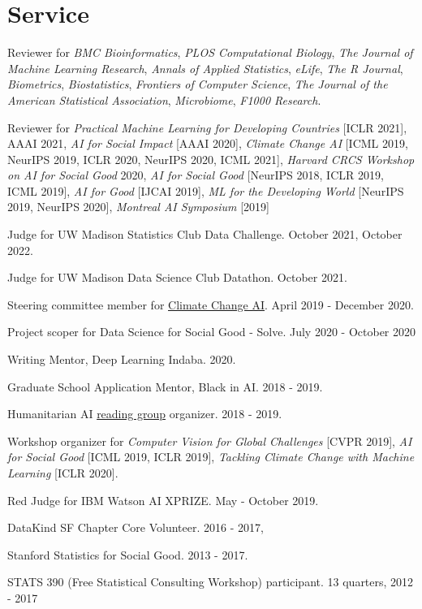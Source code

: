 \documentclass[letterpaper]{article}
\renewenvironment{itemize}{
  \begin{list}{}{
    \setlength{\leftmargin}{1.5em}
  }
}{
  \end{list}
}
\begin{document}
\section*{Service}

\begin{itemize}
\item Reviewer for \textit{BMC Bioinformatics}, \textit{PLOS Computational
Biology}, \textit{The Journal of Machine Learning Research}, \textit{Annals of
Applied Statistics}, \textit{eLife}, \textit{The R Journal},
\textit{Biometrics}, \textit{Biostatistics}, \textit{Frontiers of Computer
Science}, \textit{The Journal of the American Statistical Association},
\textit{Microbiome}, \textit{F1000 Research}.
\item Reviewer for \textit{Practical Machine Learning for Developing Countries}
  [ICLR 2021], AAAI 2021, \textit{AI for Social Impact} [AAAI 2020],
  \textit{Climate Change AI} [ICML 2019, NeurIPS 2019, ICLR 2020, NeurIPS 2020, ICML 2021],
  \textit{Harvard CRCS Workshop on AI for Social Good} 2020, \textit{AI for
    Social Good} [NeurIPS 2018, ICLR 2019, ICML 2019], \textit{AI for Good}
         [IJCAI 2019], \textit{ML for the Developing World} [NeurIPS 2019,
           NeurIPS 2020], \textit{Montreal AI Symposium} [2019]
\item Judge for UW Madison Statistics Club Data Challenge. October 2021, October 2022.
\item Judge for UW Madison Data Science Club Datathon. October 2021.
\item Steering committee member for \href{https://www.climatechange.ai}{Climate
Change AI}. April 2019 - December 2020.
\item Project scoper for Data Science for Social Good - Solve. July 2020 - October 2020
\item Writing Mentor, Deep Learning Indaba. 2020.
\item Graduate School Application Mentor, Black in AI. 2018 - 2019.
\item Humanitarian AI \href{https://krisrs1128.github.io/Humanitarian-AI/}{reading group} organizer. 2018 - 2019.
\item Workshop organizer for \textit{Computer Vision for Global Challenges}
  [CVPR 2019], \textit{AI for Social Good} [ICML 2019, ICLR 2019],
  \textit{Tackling Climate Change with Machine Learning} [ICLR 2020].
\item Red Judge for IBM Watson AI XPRIZE. May - October 2019.
\item DataKind SF Chapter Core Volunteer. 2016 - 2017,
\item Stanford Statistics for Social Good. 2013 - 2017.
\item STATS 390 (Free Statistical Consulting Workshop) participant. 13 quarters, 2012 - 2017
\end{itemize}
\end{document}
